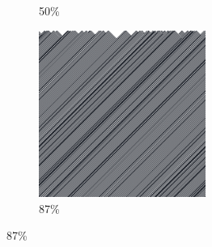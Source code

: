 \documentclass[12pt, fleqn]{report}                             %
\theoremstyle{break}                                            %
\begin{document}
\begin{figure}[ht!]
\begin{subfigure}[b]{0.4\linewidth}
          \caption{50\%}
        \end{subfigure}
        \begin{subfigure}[b]{0.4\linewidth}
          \includegraphics[width=0.6\textwidth]{Images/134/d.png}
          \caption{87\%}
        \end{subfigure}
      \end{figure}
\end{document}
